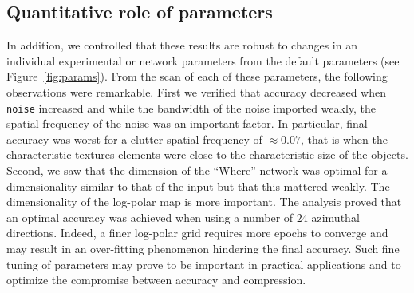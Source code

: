 \subsection{Quantitative role of parameters}


In addition, we controlled that these results are robust to changes in an individual experimental or network parameters from the default parameters (see Figure~\ref{fig:params}). From the scan of each of these parameters, the following observations were remarkable. First we verified that accuracy decreased when \texttt{noise} increased and while the bandwidth of the noise imported weakly, the spatial frequency of the noise was an important factor. In particular, final accuracy was worst for a clutter spatial frequency of $\approx 0.07$, that is when the characteristic textures elements were close to the characteristic size of the objects. Second, we saw that the dimension of the ``Where'' network was optimal for a dimensionality similar to that of the input but that this mattered weakly. The dimensionality of the log-polar map is more important. The analysis proved that an optimal accuracy was achieved when using a number of $24$ azimuthal directions. Indeed, a finer log-polar grid requires more epochs to converge and may result in an over-fitting phenomenon hindering the final accuracy. Such fine tuning of parameters may prove to be important in practical applications and to optimize the compromise between accuracy and compression.
